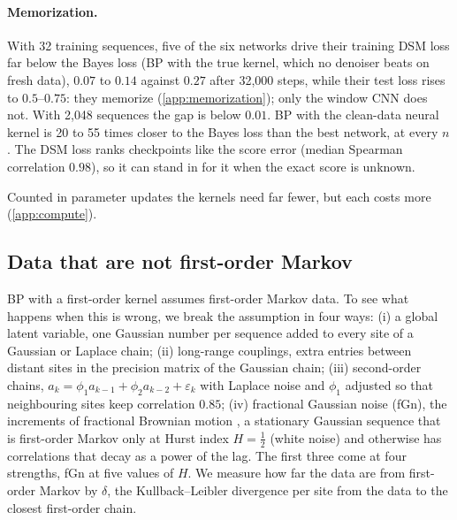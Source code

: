 \documentclass{article}
\begin{document}
\paragraph{Memorization.}
\label{sec:memorization}
With 32 training sequences, five of the six networks drive their training DSM loss far below the Bayes loss (BP with
the true kernel, which no denoiser beats on fresh data), $0.07$ to $0.14$ against $0.27$ after 32{,}000 steps, while
their test loss rises to $0.5$--$0.75$: they memorize (\cref{app:memorization}); only the window CNN does not. With 2{,}048 sequences the gap is below $0.01$. BP with the
clean-data neural kernel is 20 to 55 times closer to the Bayes loss than the best network, at every $n$. The DSM loss
ranks checkpoints like the score error (median Spearman correlation $0.98$), so it can stand in for it when the exact
score is unknown.

Counted in parameter updates the kernels need far fewer, but each costs more (\cref{app:compute}).

\subsection{Data that are not first-order Markov}
\label{sec:nonmarkov}

BP with a first-order kernel assumes first-order Markov data. To see what happens when this is wrong, we break the
assumption in four ways: (i) a global latent variable, one Gaussian number per sequence added to every site of a
Gaussian or Laplace chain; (ii) long-range couplings, extra entries between distant sites in the precision matrix of the
Gaussian chain; (iii) second-order chains, $a_k=\phi_1a_{k-1}+\phi_2a_{k-2}+\varepsilon_k$ with Laplace noise and
$\phi_1$ adjusted so that neighbouring sites keep correlation $0.85$; (iv) fractional Gaussian noise (fGn), the
increments of fractional Brownian motion \cite{mandelbrot1968fractional}, a stationary Gaussian sequence that is
first-order Markov only at Hurst index $H=\frac12$ (white noise) and otherwise has correlations that decay as a power of
the lag. The first three come at four strengths, fGn at five values of $H$. We measure how far the data are from first-order Markov by $\delta$,
the Kullback--Leibler divergence per site from the data to the closest first-order chain.
\end{document}
